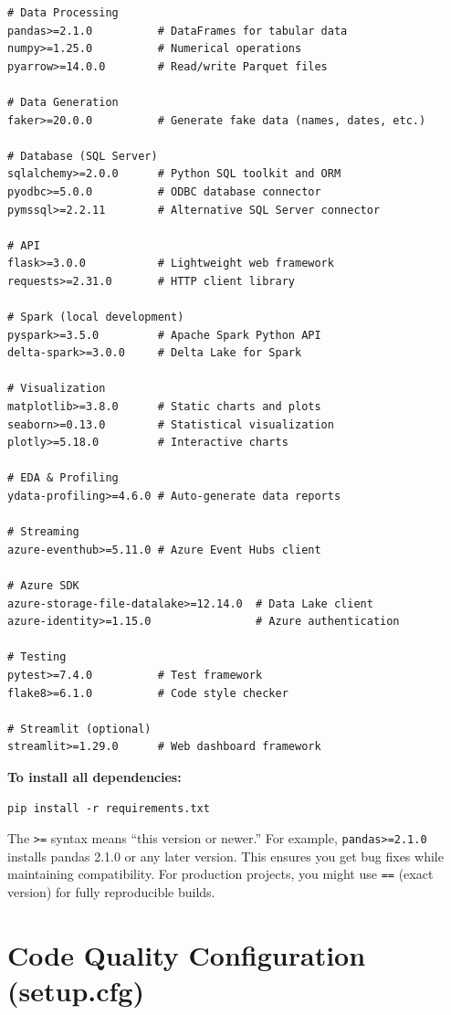 \documentclass[12pt, a4paper, oneside]{report}
\begin{document}
\begin{lstlisting}[style=bashstyle, caption={requirements.txt --- organized by purpose}]
# Data Processing
pandas>=2.1.0          # DataFrames for tabular data
numpy>=1.25.0          # Numerical operations
pyarrow>=14.0.0        # Read/write Parquet files

# Data Generation
faker>=20.0.0          # Generate fake data (names, dates, etc.)

# Database (SQL Server)
sqlalchemy>=2.0.0      # Python SQL toolkit and ORM
pyodbc>=5.0.0          # ODBC database connector
pymssql>=2.2.11        # Alternative SQL Server connector

# API
flask>=3.0.0           # Lightweight web framework
requests>=2.31.0       # HTTP client library

# Spark (local development)
pyspark>=3.5.0         # Apache Spark Python API
delta-spark>=3.0.0     # Delta Lake for Spark

# Visualization
matplotlib>=3.8.0      # Static charts and plots
seaborn>=0.13.0        # Statistical visualization
plotly>=5.18.0         # Interactive charts

# EDA & Profiling
ydata-profiling>=4.6.0 # Auto-generate data reports

# Streaming
azure-eventhub>=5.11.0 # Azure Event Hubs client

# Azure SDK
azure-storage-file-datalake>=12.14.0  # Data Lake client
azure-identity>=1.15.0                # Azure authentication

# Testing
pytest>=7.4.0          # Test framework
flake8>=6.1.0          # Code style checker

# Streamlit (optional)
streamlit>=1.29.0      # Web dashboard framework
\end{lstlisting}

\textbf{To install all dependencies:}
\begin{lstlisting}[style=bashstyle]
pip install -r requirements.txt
\end{lstlisting}

\begin{tipbox}
    The \texttt{>=} syntax means ``this version or newer.'' For example, \texttt{pandas>=2.1.0} installs pandas 2.1.0 or any later version. This ensures you get bug fixes while maintaining compatibility. For production projects, you might use \texttt{==} (exact version) for fully reproducible builds.
\end{tipbox}

\section{Code Quality Configuration (setup.cfg)}
\end{document}
